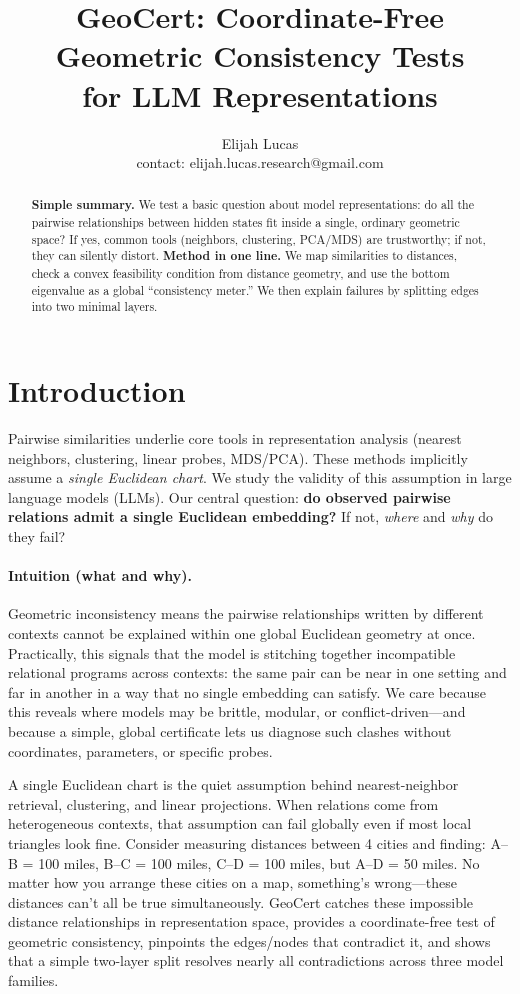 \documentclass[11pt]{article}
\title{GeoCert: Coordinate-Free Geometric Consistency Tests\\
for LLM Representations}
\author{Elijah Lucas\\
\tiny contact: elijah.lucas.research@gmail.com}
\date{}
\newcommand{\1}{\mathbf{1}}
\begin{document}
\maketitle

\begin{abstract}
\textbf{Simple summary.} We test a basic question about model representations: do all the pairwise relationships between hidden states fit inside a single, ordinary geometric space? If yes, common tools (neighbors, clustering, PCA/MDS) are trustworthy; if not, they can silently distort. \textbf{Method in one line.} We map similarities to distances, check a convex feasibility condition from distance geometry, and use the bottom eigenvalue as a global ``consistency meter.'' We then explain failures by splitting edges into two minimal layers.
\end{abstract}

\vspace{-0.5em}
\section{Introduction}
Pairwise similarities underlie core tools in representation analysis (nearest neighbors, clustering, linear probes, MDS/PCA). These methods implicitly assume a \emph{single Euclidean chart}. We study the validity of this assumption in large language models (LLMs). Our central question: \textbf{do observed pairwise relations admit a single Euclidean embedding?} If not, \emph{where} and \emph{why} do they fail?

\paragraph{Intuition (what and why).} Geometric inconsistency means the pairwise relationships written by different contexts cannot be explained within one global Euclidean geometry at once. Practically, this signals that the model is stitching together incompatible relational programs across contexts: the same pair can be near in one setting and far in another in a way that no single embedding can satisfy. We care because this reveals where models may be brittle, modular, or conflict-driven---and because a simple, global certificate lets us diagnose such clashes without coordinates, parameters, or specific probes.

A single Euclidean chart is the quiet assumption behind nearest-neighbor retrieval, clustering, and linear projections. When relations come from heterogeneous contexts, that assumption can fail globally even if most local triangles look fine. Consider measuring distances between 4 cities and finding: A--B = 100 miles, B--C = 100 miles, C--D = 100 miles, but A--D = 50 miles. No matter how you arrange these cities on a map, something's wrong---these distances can't all be true simultaneously. GeoCert catches these impossible distance relationships in representation space, provides a coordinate-free test of geometric consistency, pinpoints the edges/nodes that contradict it, and shows that a simple two-layer split resolves nearly all contradictions across three model families.
\end{document}

